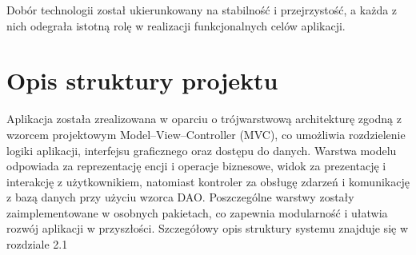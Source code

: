 Dobór technologii został ukierunkowany na stabilność i przejrzystość, a każda z nich odegrała istotną rolę w realizacji funkcjonalnych celów aplikacji.


\section{Opis struktury projektu}

Aplikacja została zrealizowana w oparciu o trójwarstwową architekturę zgodną z wzorcem projektowym Model–View–Controller (MVC), co umożliwia rozdzielenie logiki aplikacji, interfejsu graficznego oraz dostępu do danych. Warstwa modelu odpowiada za reprezentację encji i operacje biznesowe, widok za prezentację i interakcję z użytkownikiem, natomiast kontroler za obsługę zdarzeń i komunikację z bazą danych przy użyciu wzorca DAO. Poszczególne warstwy zostały zaimplementowane w osobnych pakietach, co zapewnia modularność i ułatwia rozwój aplikacji w przyszłości. Szczegółowy opis struktury systemu znajduje się w rozdziale 2.1


